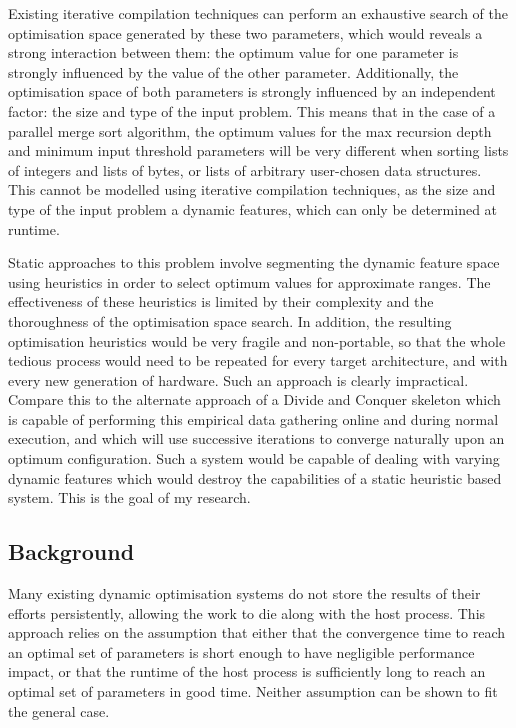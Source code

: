 Existing iterative compilation techniques can perform an exhaustive
search of the optimisation space generated by these two parameters,
which would reveals a strong interaction between them: the optimum
value for one parameter is strongly influenced by the value of the
other parameter. Additionally, the optimisation space of both
parameters is strongly influenced by an independent factor: the size
and type of the input problem. This means that in the case of a
parallel merge sort algorithm, the optimum values for the max
recursion depth and minimum input threshold parameters will be very
different when sorting lists of integers and lists of bytes, or lists
of arbitrary user-chosen data structures. This cannot be modelled
using iterative compilation techniques, as the size and type of the
input problem a dynamic features, which can only be determined at
runtime.

Static approaches to this problem involve segmenting the dynamic
feature space using heuristics in order to select optimum values for
approximate ranges. The effectiveness of these heuristics is limited
by their complexity and the thoroughness of the optimisation space
search. In addition, the resulting optimisation heuristics would be
very fragile and non-portable, so that the whole tedious process would
need to be repeated for every target architecture, and with every new
generation of hardware. Such an approach is clearly
impractical. Compare this to the alternate approach of a Divide and
Conquer skeleton which is capable of performing this empirical data
gathering online and during normal execution, and which will use
successive iterations to converge naturally upon an optimum
configuration. Such a system would be capable of dealing with varying
dynamic features which would destroy the capabilities of a static
heuristic based system. This is the goal of my research.

\subsection{Background}
Many existing dynamic optimisation systems do not store the results of
their efforts persistently, allowing the work to die along with the
host process. This approach relies on the assumption that either that
the convergence time to reach an optimal set of parameters is short
enough to have negligible performance impact, or that the runtime of
the host process is sufficiently long to reach an optimal set of
parameters in good time. Neither assumption can be shown to fit the
general case.

